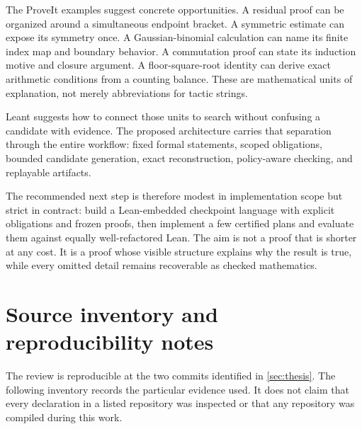 \documentclass[11pt,a4paper]{article}
\theoremstyle{definition}
\theoremstyle{remark}
\numberwithin{equation}{section}
\begin{document}
The ProveIt examples suggest concrete opportunities. A residual proof can be organized around a simultaneous endpoint bracket. A symmetric estimate can expose its symmetry once. A Gaussian-binomial calculation can name its finite index map and boundary behavior. A commutation proof can state its induction motive and closure argument. A floor-square-root identity can derive exact arithmetic conditions from a counting balance. These are mathematical units of explanation, not merely abbreviations for tactic strings.

Leant suggests how to connect those units to search without confusing a candidate with evidence. The proposed architecture carries that separation through the entire workflow: fixed formal statements, scoped obligations, bounded candidate generation, exact reconstruction, policy-aware checking, and replayable artifacts.

The recommended next step is therefore modest in implementation scope but strict in contract: build a Lean-embedded checkpoint language with explicit obligations and frozen proofs, then implement a few certified plans and evaluate them against equally well-refactored Lean. The aim is not a proof that is shorter at any cost. It is a proof whose visible structure explains why the result is true, while every omitted detail remains recoverable as checked mathematics.

\clearpage
\appendix
\section{Source inventory and reproducibility notes}
\label{app:sources}
\begingroup\small
The review is reproducible at the two commits identified in \cref{sec:thesis}. The following inventory records the particular evidence used. It does not claim that every declaration in a listed repository was inspected or that any repository was compiled during this work.
\end{document}
